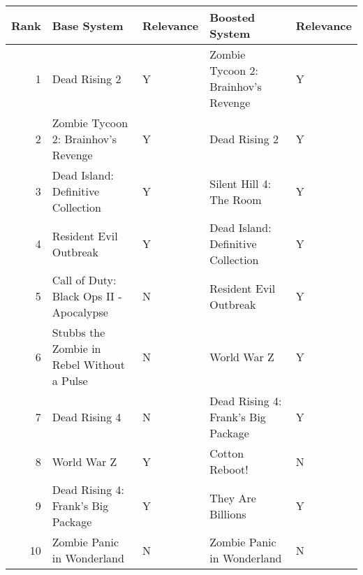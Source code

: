 \begin{tabular}{rllll}
\toprule
Rank & Base System & Relevance & Boosted System & Relevance \\
\midrule
1 & Dead Rising 2 & Y & Zombie Tycoon 2: Brainhov's Revenge & Y \\
2 & Zombie Tycoon 2: Brainhov's Revenge & Y & Dead Rising 2 & Y \\
3 & Dead Island: Definitive Collection & Y & Silent Hill 4: The Room & Y \\
4 & Resident Evil Outbreak & Y & Dead Island: Definitive Collection & Y \\
5 & Call of Duty: Black Ops II - Apocalypse & N & Resident Evil Outbreak & Y \\
6 & Stubbs the Zombie in Rebel Without a Pulse & N & World War Z & Y \\
7 & Dead Rising 4 & N & Dead Rising 4: Frank's Big Package & Y \\
8 & World War Z & Y & Cotton Reboot! & N \\
9 & Dead Rising 4: Frank's Big Package & Y & They Are Billions & Y \\
10 & Zombie Panic in Wonderland & N & Zombie Panic in Wonderland & N \\
\bottomrule
\end{tabular}
